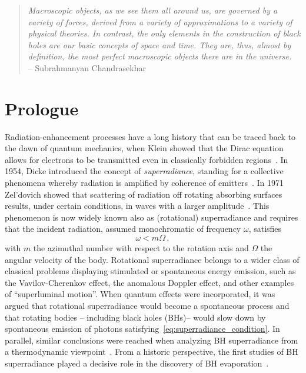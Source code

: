 \documentclass[11pt]{article}
\newcommand{\be}{\begin{equation}}
\newcommand{\ee}{\end{equation}}
\numberwithin{equation}{section} %
\begin{document}
\clearpage
\newpage



\clearpage
\newpage
\begin{quote}
\raggedleft
 \textit{Macroscopic objects, as we see them all around us, are governed by a variety of forces, derived from a variety of approximations to a variety of physical theories. In contrast, the only elements in the construction of black holes are our basic concepts of space and time. They are, thus, almost by definition, the most perfect macroscopic objects there are in the universe.} \\ -- Subrahmanyan Chandrasekhar \\
\end{quote}
\section{Prologue}
\label{sec:prologue}



Radiation-enhancement processes have a long history that can be traced back to the dawn of quantum mechanics, when Klein showed that the Dirac equation allows for electrons to be transmitted even in classically forbidden regions~\cite{Kleinparadox}.
In 1954, Dicke introduced the concept of {\it superradiance}, standing for a collective phenomena
whereby radiation is amplified by coherence of emitters~\cite{Dicke:1954zz}. In 1971 Zel'dovich showed that scattering of radiation off rotating absorbing surfaces
results, under certain conditions, in waves with a larger amplitude~\cite{zeldovich1,zeldovich2}. This phenomenon
is now widely known also as (rotational) superradiance and requires that
the incident radiation, assumed monochromatic of frequency $\omega$, satisfies
%
\be
\omega <m\Omega\,,\label{eq:superradiance_condition}
\ee
%
with $m$ the azimuthal number with respect to the rotation axis and $\Omega$ the angular velocity of the body.
Rotational superradiance belongs to a wider class of classical problems
displaying stimulated or spontaneous energy emission, such as the Vavilov-Cherenkov effect, the anomalous 
Doppler effect, and other examples of ``superluminal motion''. When quantum effects were incorporated,
it was argued that rotational superradiance would become a spontaneous process and that rotating bodies -- including black holes (BHs)--
would slow down by spontaneous emission of photons satisfying~\eqref{eq:superradiance_condition}.
In parallel, similar conclusions were reached when analyzing BH superradiance from a thermodynamic viewpoint~\cite{Bekenstein:1973mi,Bekenstein:1998nt}.
From a historic perspective, the first studies of BH superradiance
played a decisive role in the discovery of BH evaporation~\cite{Hawking:1974sw,Hawking:book}.
\end{document}
